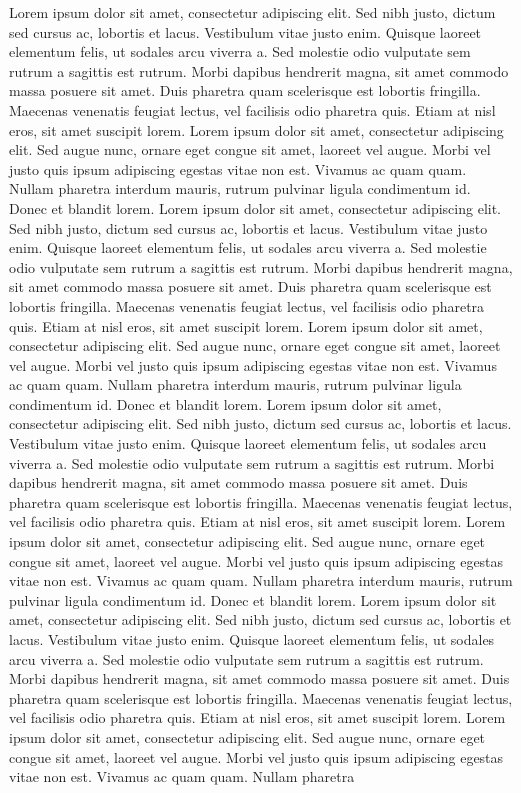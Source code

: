 Lorem ipsum dolor sit amet, consectetur adipiscing elit. Sed nibh justo, dictum sed cursus ac, lobortis et lacus. Vestibulum vitae justo enim. Quisque laoreet elementum felis, ut sodales arcu viverra a. Sed molestie odio vulputate sem rutrum a sagittis est rutrum. Morbi dapibus hendrerit magna, sit amet commodo massa posuere sit amet. Duis pharetra quam scelerisque est lobortis fringilla. Maecenas venenatis feugiat lectus, vel facilisis odio pharetra quis. Etiam at nisl eros, sit amet suscipit lorem. Lorem ipsum dolor sit amet, consectetur adipiscing elit. Sed augue nunc, ornare eget congue sit amet, laoreet vel augue. Morbi vel justo quis ipsum adipiscing egestas vitae non est. Vivamus ac quam quam. Nullam pharetra
                                                    interdum mauris, rutrum pulvinar ligula condimentum id. Donec et blandit lorem. Lorem ipsum dolor sit amet, consectetur adipiscing elit. Sed nibh justo, dictum sed cursus ac, lobortis et lacus. Vestibulum vitae justo enim. Quisque laoreet elementum felis, ut sodales arcu viverra a. Sed molestie odio vulputate sem rutrum a sagittis est rutrum. Morbi dapibus hendrerit magna, sit amet commodo massa posuere sit amet. Duis pharetra quam scelerisque est lobortis fringilla. Maecenas venenatis feugiat lectus, vel facilisis odio pharetra quis. Etiam at nisl eros, sit amet suscipit lorem. Lorem ipsum dolor sit amet, consectetur adipiscing elit. Sed augue nunc, ornare eget congue sit amet, laoreet vel augue. Morbi vel justo quis ipsum adipiscing egestas vitae non est. Vivamus ac quam quam. Nullam pharetra
                                                    interdum mauris, rutrum pulvinar ligula condimentum id. Donec et blandit lorem. Lorem ipsum dolor sit amet, consectetur adipiscing elit. Sed nibh justo, dictum sed cursus ac, lobortis et lacus. Vestibulum vitae justo enim. Quisque laoreet elementum felis, ut sodales arcu viverra a. Sed molestie odio vulputate sem rutrum a sagittis est rutrum. Morbi dapibus hendrerit magna, sit amet commodo massa posuere sit amet. Duis pharetra quam scelerisque est lobortis fringilla. Maecenas venenatis feugiat lectus, vel facilisis odio pharetra quis. Etiam at nisl eros, sit amet suscipit lorem. Lorem ipsum dolor sit amet, consectetur adipiscing elit. Sed augue nunc, ornare eget congue sit amet, laoreet vel augue. Morbi vel justo quis ipsum adipiscing egestas vitae non est. Vivamus ac quam quam. Nullam pharetra
                                                    interdum mauris, rutrum pulvinar ligula condimentum id. Donec et blandit lorem. Lorem ipsum dolor sit amet, consectetur adipiscing elit. Sed nibh justo, dictum sed cursus ac, lobortis et lacus. Vestibulum vitae justo enim. Quisque laoreet elementum felis, ut sodales arcu viverra a. Sed molestie odio vulputate sem rutrum a sagittis est rutrum. Morbi dapibus hendrerit magna, sit amet commodo massa posuere sit amet. Duis pharetra quam scelerisque est lobortis fringilla. Maecenas venenatis feugiat lectus, vel facilisis odio pharetra quis. Etiam at nisl eros, sit amet suscipit lorem. Lorem ipsum dolor sit amet, consectetur adipiscing elit. Sed augue nunc, ornare eget congue sit amet, laoreet vel augue. Morbi vel justo quis ipsum adipiscing egestas vitae non est. Vivamus ac quam quam. Nullam pharetra
